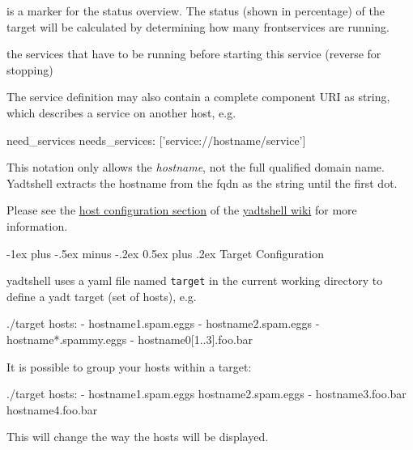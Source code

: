 \documentclass[10pt,landscape]{article}
\makeatletter
\renewcommand{\section}{\@startsection{section}{1}{0mm}%
                                {-1ex plus -.5ex minus -.2ex}%
                                {0.5ex plus .2ex}%
                                {\normalfont\large\bfseries}}
\newcommand{\note}[2][Note]{
\begin{description}[font=\bfseries,leftmargin=1cm,style=sameline]
    \item [{#1}] {#2}
\end{description}
}
\makeatother
\begin{document}
\begin{multicols}{3}
\begin{description}[font=\bfseries,leftmargin=1cm,style=sameline]
    \item [is\_frontservice]
    is a marker for the status overview. The status
    (shown in percentage) of the target will be
    calculated by determining how many
    frontservices are running.
\item [needs\_services]
    the services that have to be running before
    starting this service (reverse for stopping)
\end{description}

The service definition may also contain a complete component URI as string,
which describes a service on another host, e.g.

\begin{examples}{need\_services}
needs_services: ['service://hostname/service']
\end{examples}

\note{This notation only allows the \emph{hostname},
not the full qualified domain name. Yadtshell extracts the hostname from
the fqdn as the string until the first dot.}

Please see the
\href{https://github.com/yadt/yadtshell/wiki/Host-Configuration}{host configuration section}
of the \href{https://github.com/yadt/yadtshell/wiki}{yadtshell wiki}
for more information.



\section{Target Configuration}

yadtshell uses a yaml file named
\verb+target+ in the current working directory to define a yadt target (set of hosts), e.g.

\begin{examples}{./target}
hosts:
- hostname1.spam.eggs
- hostname2.spam.eggs
- hostname*.spammy.eggs
- hostname0[1..3].foo.bar
\end{examples}

It is possible to group your hosts within a target:

\begin{examples}{./target}
hosts:
- hostname1.spam.eggs hostname2.spam.eggs
- hostname3.foo.bar hostname4.foo.bar
\end{examples}

This will change the way the hosts will be displayed.




\end{multicols}
\end{document}

